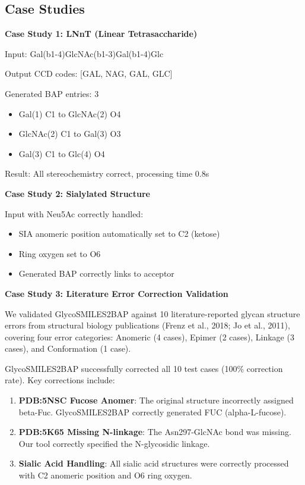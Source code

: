 \subsection{Case Studies}

\textbf{Case Study 1: LNnT (Linear Tetrasaccharide)}

Input: Gal(b1-4)GlcNAc(b1-3)Gal(b1-4)Glc

Output CCD codes: [GAL, NAG, GAL, GLC]

Generated BAP entries: 3
\begin{itemize}
\item Gal(1) C1 to GlcNAc(2) O4
\item GlcNAc(2) C1 to Gal(3) O3
\item Gal(3) C1 to Glc(4) O4
\end{itemize}

Result: All stereochemistry correct, processing time 0.8s

\textbf{Case Study 2: Sialylated Structure}

Input with Neu5Ac correctly handled:
\begin{itemize}
\item SIA anomeric position automatically set to C2 (ketose)
\item Ring oxygen set to O6
\item Generated BAP correctly links to acceptor
\end{itemize}

\textbf{Case Study 3: Literature Error Correction Validation}

We validated GlycoSMILES2BAP against 10 literature-reported glycan structure errors from structural biology publications (Frenz et al., 2018; Jo et al., 2011), covering four error categories: Anomeric (4 cases), Epimer (2 cases), Linkage (3 cases), and Conformation (1 case).

GlycoSMILES2BAP successfully corrected all 10 test cases (100\% correction rate). Key corrections include:
\begin{enumerate}
\item \textbf{PDB:5NSC Fucose Anomer}: The original structure incorrectly assigned beta-Fuc. GlycoSMILES2BAP correctly generated FUC (alpha-L-fucose).
\item \textbf{PDB:5K65 Missing N-linkage}: The Asn297-GlcNAc bond was missing. Our tool correctly specified the N-glycosidic linkage.
\item \textbf{Sialic Acid Handling}: All sialic acid structures were correctly processed with C2 anomeric position and O6 ring oxygen.
\end{enumerate}

